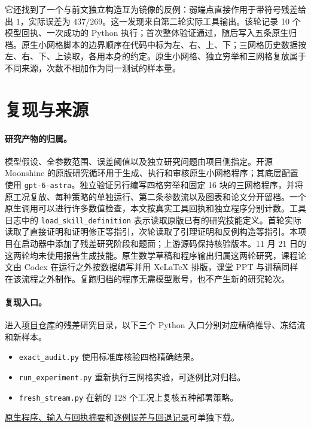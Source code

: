 它还找到了一个与前文独立构造互为镜像的反例：弱端点直接作用于带符号残差给出 $1$，实际误差为 $437/269$。这一发现来自第二轮实际工具输出。该轮记录 10 个模型回执、一次成功的 Python 执行；首次整体验证通过，随后写入五条原生归档。原生小网格脚本的边界顺序在代码中标为左、右、上、下；三网格历史数据按左、右、下、上读取，各用本身的约定。原生小网格、独立穷举和三网格复放属于不同来源，次数不相加作为同一测试的样本量。

\clearpage
\section{复现与来源}
\paragraph{研究产物的归属。}
模型假设、全参数范围、误差阈值以及独立研究问题由项目侧指定。开源 Moonshine 的原版研究循环用于生成、执行和审核原生小网格程序；其底层配置使用 \texttt{gpt-6-astra}。独立验证另行编写四格穷举和固定 16 块的三网格程序，并将原工况复放、每种策略的单独运行、第二条参数流以及图表和论文分开留档。一个原生调用可以进行许多数值检查，本文按真实工具回执和独立程序分别计数。工具日志中的 \texttt{load\_skill\_definition} 表示读取原版已有的研究技能定义。首轮实际读取了直接证明和证明修正等指引，次轮读取了引理证明和反例构造等指引。本项目在启动器中添加了残差研究阶段和题面；上游源码保持核验版本。11 月 21 日的这两轮均未使用报告生成技能。原生数学草稿和程序输出归属这两轮研究，课程论文由 Codex 在运行之外按数据编写并用 XeLaTeX 排版，课堂 PPT 与讲稿同样在该流程之外制作。复跑归档的程序无需模型账号，也不产生新的研究轮次。

\paragraph{复现入口。}
进入\href{https://github.com/orgyuanbao/MoonshineThermalLab}{项目仓库}的残差研究目录，以下三个 Python 入口分别对应精确推导、冻结流和新样本。
\begin{itemize}\setlength{\itemsep}{0pt}
\item \texttt{exact\_audit.py} 使用标准库核验四格精确结果。
\item \texttt{run\_experiment.py} 重新执行三网格实验，可逐例比对归档。
\item \texttt{fresh\_stream.py} 在新的 128 个工况上复核五种部署策略。
\end{itemize}
\href{https://github.com/orgyuanbao/MoonshineThermalLab/tree/main/MoonshineThermalLab/residual_study/moonshine}{原生程序、输入与回执摘要}和\href{https://github.com/orgyuanbao/MoonshineThermalLab/tree/main/MoonshineThermalLab/residual_study/results}{逐例误差与回退记录}可单独下载。
